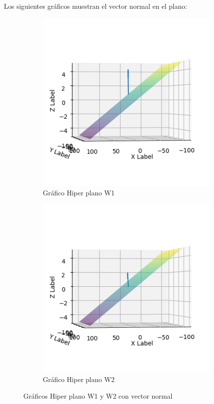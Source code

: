 \documentclass[12 pt]{article}
\begin{document}
\begin{enumerate}
Los siguientes gráficos muestran el vector normal en el plano:
\begin{figure}[H]
    \centering
    \begin{subfigure}[b]{0.45\linewidth}
        \centering
        \includegraphics[width=\linewidth]{img/w1_n.png}
        \caption{Gráfico Hiper plano W1}
        \label{fig:w1}
    \end{subfigure}
    \hfill
    \begin{subfigure}[b]{0.45\linewidth}
        \centering
        \includegraphics[width=\linewidth]{img/w2_n.png}
        \caption{Gráfico Hiper plano W2}
        \label{fig:w2}
    \end{subfigure}
    \caption{Gráficos Hiper plano W1 y W2 con vector normal}
    \label{fig:planos}
\end{figure}


\end{enumerate}
\end{document}

